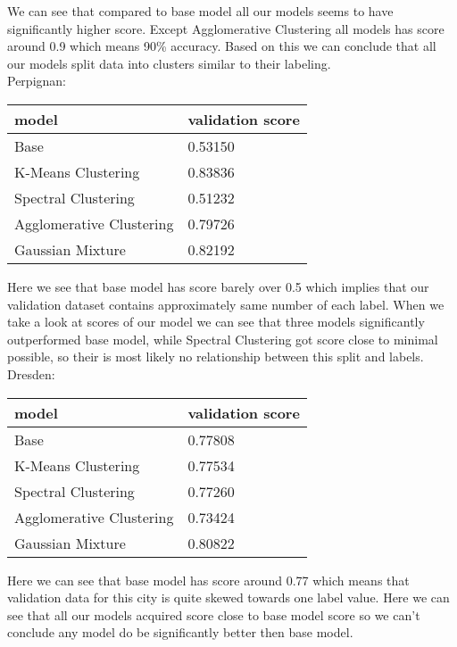 \documentclass[a4paper]{article}
\begin{document}
	We can see that compared to base model all our models seems to have significantly higher score. Except Agglomerative Clustering all models has score around 0.9 which means 90\% accuracy. Based on this we can conclude that all our models split data into clusters similar to their labeling.
	\\
	
	Perpignan:
	\begin{table}[!h]
		\begin{tabular}{|l|l|}
			\hline
			model &  validation score  \\ \hline
			Base & 0.53150 \\ \hline
			K-Means Clustering & 0.83836 \\ \hline
			Spectral Clustering &  0.51232 \\ \hline
			Agglomerative Clustering  &  0.79726 \\ \hline
			Gaussian Mixture &  0.82192 \\ \hline
		\end{tabular}
	\end{table} 

	Here we see that base model has score barely over 0.5 which implies that our validation dataset contains approximately same number of each label. When we take a look at scores of our model we can see that three models significantly outperformed base model, while Spectral Clustering got score close to minimal possible, so their is most likely no relationship between this split and labels.
	\\

	Dresden:
	\begin{table}[!h]
		\begin{tabular}{|l|l|}
			\hline
			model &  validation score  \\ \hline
			Base & 0.77808 \\ \hline
			K-Means Clustering & 0.77534 \\ \hline
			Spectral Clustering &  0.77260 \\ \hline
			Agglomerative Clustering  &  0.73424 \\ \hline
			Gaussian Mixture &  0.80822 \\ \hline
		\end{tabular}
	\end{table} 
	
	Here we can see that base model has score around 0.77 which means that validation data for this city is quite skewed towards one label value. Here we can see that all our models acquired score close to base model score so we can't conclude any model do be significantly better then base model.
	\\
	
\end{document}
